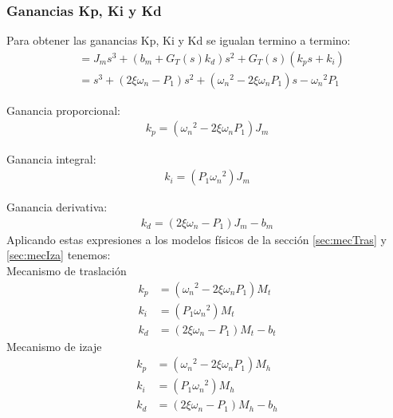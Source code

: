 \documentclass[journal]{IEEEtran}
\begin{document}
\subsubsection{Ganancias Kp, Ki y Kd}
Para obtener las ganancias Kp, Ki y Kd se igualan termino a termino:
\begin{align}
  &=J_m s^3 + (b_m + G_T(s) k_d) s^2 + G_T (s)(k_p s + k_i)\\
  &= s^3 + (2 \xi {\omega}_n - P_1) s^2 + ({{\omega}_n}^2 - 2 \xi {\omega}_n P_1) s - {{\omega}_n}^2 P_1
\end{align}

Ganancia proporcional: 
\begin{align}
  k_p = ({{\omega}_n}^2 - 2 \xi {\omega}_n P_1) J_m
\end{align}

Ganancia integral:
\begin{align}
  k_i = (P_1 {{\omega}_n}^2) J_m
\end{align}

Ganancia derivativa:
\begin{align}
  k_d = (2 \xi {\omega}_n - P_1) J_m - b_m
\end{align}
Aplicando estas expresiones a los modelos físicos de la sección \ref{sec:mecTras} y 
\ref{sec:mecIza} tenemos:\\
Mecanismo de traslación
\begin{align}
  k_p &= ({{\omega}_n}^2 - 2 \xi {\omega}_n P_1) M_t\\
  k_i &= (P_1 {{\omega}_n}^2) M_t\\
  k_d &= (2 \xi {\omega}_n - P_1) M_t - b_t
\end{align}
Mecanismo de izaje
\begin{align}
  k_p &= ({{\omega}_n}^2 - 2 \xi {\omega}_n P_1) M_h\\
  k_i &= (P_1 {{\omega}_n}^2) M_h\\
  k_d &= (2 \xi {\omega}_n - P_1) M_h - b_h
\end{align}
\end{document}
